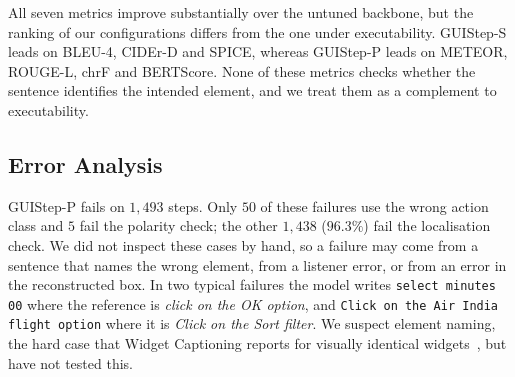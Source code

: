 \documentclass[runningheads,a4paper]{llncs}
\begin{document}
\begin{table}[t]
\centering
\caption{Reference-overlap metrics on the same $4{,}463$ steps, one reference per step.}
\label{tab:text}
\small
\setlength{\tabcolsep}{3.2pt}
\end{table}

All seven metrics improve substantially over the untuned backbone, but the ranking of our
configurations differs from the one under executability. \mbox{GUIStep-S} leads on BLEU-4, CIDEr-D and
SPICE, whereas \mbox{GUIStep-P} leads on METEOR, ROUGE-L, chrF and BERTScore. None of these metrics checks whether the sentence identifies the intended element, and we treat them as a complement to executability.

\subsection{Error Analysis}
\label{sec:analysis}

\mbox{GUIStep-P} fails on $1{,}493$ steps. Only $50$ of these failures use the wrong action class and $5$ fail the polarity check; the other $1{,}438$ ($96.3\%$) fail the localisation check. We did not inspect these cases
by hand, so a failure may come from a sentence that names the wrong element, from a listener
error, or from an error in the reconstructed box.
In two typical failures the model writes \texttt{select minutes 00} where the reference is \emph{click on the OK option}, and \texttt{Click on the Air India flight option} where it is \emph{Click on the Sort filter}. We suspect element naming, the hard case that Widget Captioning reports for visually identical widgets~\cite{widgetcap}, but have not tested this.
\end{document}

